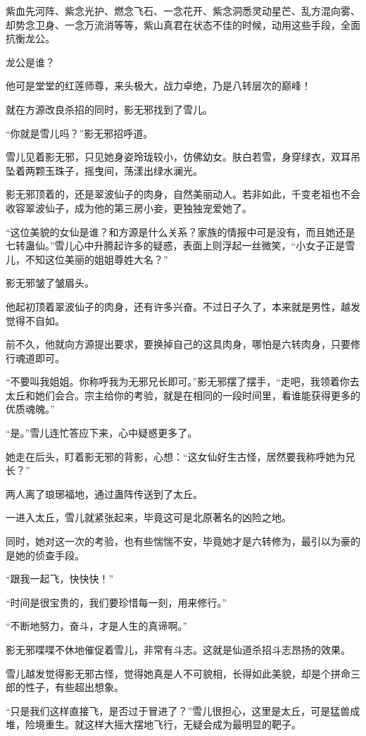\begin{this_body}
紫血先河阵、紫念光护、燃念飞石、一念花开、紫念洞悉灵动星芒、乱方混向雾、却势念卫身、一念万流消等等，紫山真君在状态不佳的时候，动用这些手段，全面抗衡龙公。

龙公是谁？

他可是堂堂的红莲师尊，来头极大，战力卓绝，乃是八转层次的巅峰！

就在方源改良杀招的同时，影无邪找到了雪儿。

“你就是雪儿吗？”影无邪招呼道。

雪儿见着影无邪，只见她身姿玲珑较小，仿佛幼女。肤白若雪，身穿绿衣，双耳吊坠着两颗玉珠子，摇曳间，荡漾出绿水澜光。

影无邪顶着的，还是翠波仙子的肉身，自然美丽动人。若非如此，千变老祖也不会收容翠波仙子，成为他的第三房小妾，更独独宠爱她了。

“这位美貌的女仙是谁？和方源是什么关系？家族的情报中可是没有，而且她还是七转蛊仙。”雪儿心中升腾起许多的疑惑，表面上则浮起一丝微笑，“小女子正是雪儿，不知这位美丽的姐姐尊姓大名？”

影无邪皱了皱眉头。

他起初顶着翠波仙子的肉身，还有许多兴奋。不过日子久了，本来就是男性，越发觉得不自如。

前不久，他就向方源提出要求，要换掉自己的这具肉身，哪怕是六转肉身，只要修行魂道即可。

“不要叫我姐姐。你称呼我为无邪兄长即可。”影无邪摆了摆手，“走吧，我领着你去太丘和她们会合。宗主给你的考验，就是在相同的一段时间里，看谁能获得更多的优质魂魄。”

“是。”雪儿连忙答应下来，心中疑惑更多了。

她走在后头，盯着影无邪的背影，心想：“这女仙好生古怪，居然要我称呼她为兄长？”

两人离了琅琊福地，通过蛊阵传送到了太丘。

一进入太丘，雪儿就紧张起来，毕竟这可是北原著名的凶险之地。

同时，她对这一次的考验，也有些惴惴不安，毕竟她才是六转修为，最引以为豪的是她的侦查手段。

“跟我一起飞，快快快！”

“时间是很宝贵的，我们要珍惜每一刻，用来修行。”

“不断地努力，奋斗，才是人生的真谛啊。”

影无邪喋喋不休地催促着雪儿，非常有斗志。这就是仙道杀招斗志昂扬的效果。

雪儿越发觉得影无邪古怪，觉得她真是人不可貌相，长得如此美貌，却是个拼命三郎的性子，有些超出想象。

“只是我们这样直接飞，是否过于冒进了？”雪儿很担心，这里是太丘，可是猛兽成堆，险境重生。就这样大摇大摆地飞行，无疑会成为最明显的靶子。


\end{this_body}
